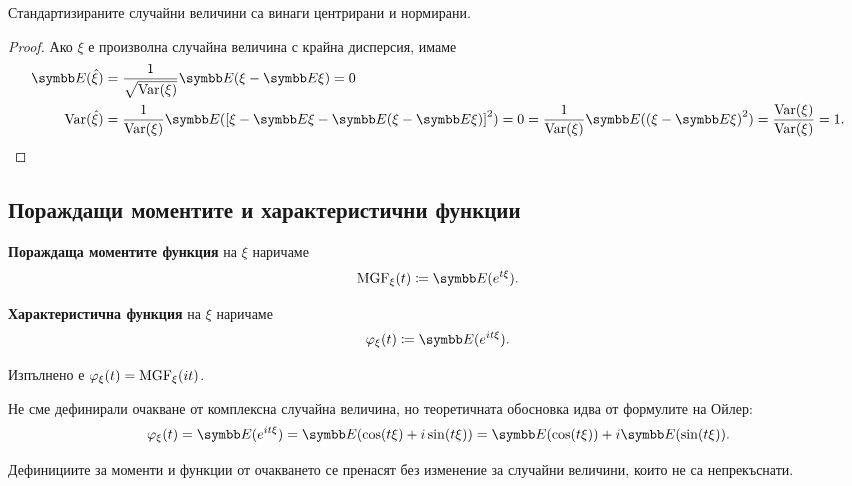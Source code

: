 \documentclass[
  headings=standardclasses,
  bibliography=totocnumbered,
]{scrartcl}
\begin{document}
\begin{proposition}
  Стандартизираните случайни величини са винаги центрирани и нормирани.
\end{proposition}
\begin{proof}
  Ако \( \xi \) е произволна случайна величина с крайна дисперсия, имаме
  \begin{align*}
    \Expect(\hat \xi)
    &=
    \frac 1 {\sqrt{\Var(\xi)}} \Expect(\xi - \Expect\xi)
    =
    0
    \\
    \Var(\hat \xi)
    &=
    \frac 1 {\Var(\xi)} \Expect({\left[ \xi - \Expect\xi - \Expect(\xi - \Expect\xi) \right]}^2) = 0
    =
    \frac 1 {\Var(\xi)} \Expect({(\xi - \Expect\xi)}^2)
    =
    \frac {\Var(\xi)} {\Var(\xi)}
    =
    1.
  \end{align*}
\end{proof}

\subsection{Пораждащи моментите и характеристични функции}

\begin{definition}
  \textbf{Пораждаща моментите функция} на \( \xi \) наричаме
  \begin{equation*}
    \MGF_\xi (t) \coloneqq \Expect(e^{t\xi}).
  \end{equation*}

  \textbf{Характеристична функция} на \( \xi \) наричаме
  \begin{equation*}
    \Char_\xi (t) \coloneqq \Expect(e^{it\xi}).
  \end{equation*}

  Изпълнено е \( \varphi_\xi(t) = \operatorname{MGF}_\xi(it) \).
\end{definition}

\begin{remark}
  Не сме дефинирали очакване от комплексна случайна величина, но теоретичната обосновка идва от формулите на Ойлер:
  \begin{equation*}
    \Char_\xi (t)
    =
    \Expect(e^{it\xi})
    =
    \Expect(\cos(t\xi) + i\sin(t\xi))
    =
    \Expect(\cos(t\xi)) + i \Expect(\sin(t\xi)).
  \end{equation*}
\end{remark}

\begin{remark}
  Дефинициите за моменти и функции от очакването се пренасят без изменение за случайни величини, които не са непрекъснати.
\end{remark}
\end{document}
